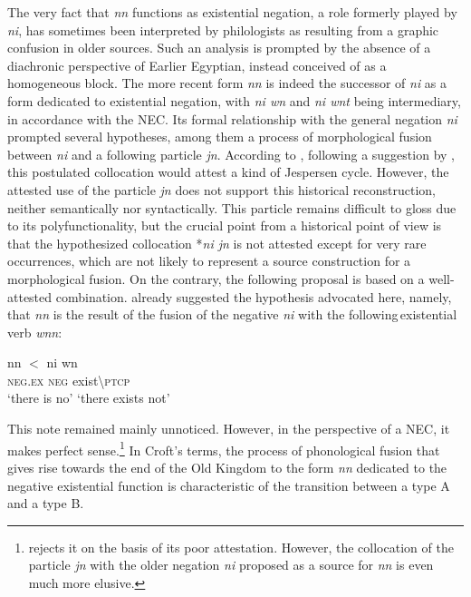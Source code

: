 \documentclass[output=paper]{langsci/langscibook}
\newcommand{\ꜥ}{ʿ}
\newcommand{\ꜣ}{\kern-.25pt\texttt{ꜣ}\kern-.6pt}
\begin{document}
The very fact that \textit{nn} functions as existential negation, a role formerly played by \textit{ni}, has sometimes been interpreted by philologists as resulting from a graphic confusion in older sources. Such an analysis is prompted by the absence of a diachronic perspective of Earlier Egyptian, instead conceived of as a homogeneous block. The more recent form \textit{nn} is indeed the successor of \textit{ni} as a form dedicated to existential negation, with \textit{ni wn} and \textit{ni wnt} being intermediary, in accordance with the NEC. Its formal relationship with the general negation \textit{ni} prompted several hypotheses, among them a process of morphological fusion between \textit{ni} and a following particle \textit{jn}. According to \citet[127]{Loprieno1995}, following a suggestion by \citet{Osing1979}, this postulated collocation would attest a kind of Jespersen cycle. However, the attested use of the particle \textit{jn} does not support this historical reconstruction, neither semantically nor syntactically. This particle remains difficult to gloss due to its polyfunctionality, but the crucial point from a historical point of view is that the hypothesized collocation *\textit{ni jn} is not attested except for very rare occurrences, which are not likely to represent a source construction for a morphological fusion. On the contrary, the following proposal is based on a well-attested combination. \citet[359]{Vergote1965formes} already suggested the hypothesis advocated here, namely, that \textit{nn} is the result of the fusion of the negative \textit{ni} with the following existential verb \textit{wnn}:  

\ea \label{ex:AE29}
    \gll nn $<$ ni wn\\ 
    \textsc{neg.ex} {} \textsc{neg} exist\textbackslash\textsc{ptcp} \\
    \glt ‘there is no’ ‘there exists not’ 
\z

This note remained mainly unnoticed. However, in the perspective of a NEC, it makes perfect sense.\footnote{\citet[311]{Osing1979} rejects it on the basis of its poor attestation. However, the collocation of the particle \textit{jn} with the older negation \textit{ni} proposed as a source for \textit{nn} is even much more elusive.} In Croft’s \citeyearpar{Croft1991} terms, the process of phonological fusion that gives rise towards the end of the Old Kingdom to the form \textit{nn} dedicated to the negative existential function is characteristic of the transition between a type A and a type B.  
 
\end{document}
